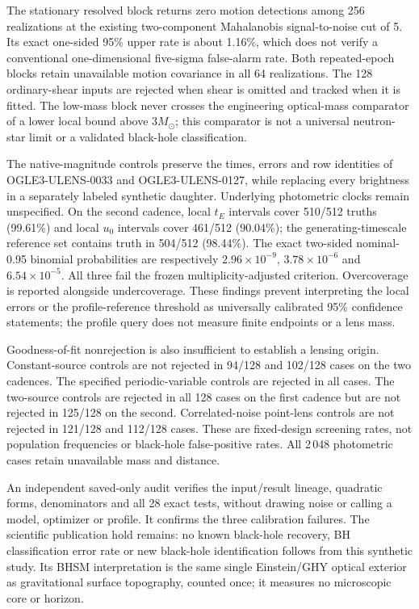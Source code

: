 The stationary resolved block returns zero motion detections among 256
realizations at the existing two-component Mahalanobis signal-to-noise
cut of 5. Its exact one-sided 95\% upper rate is about 1.16\%, which does
not verify a conventional one-dimensional five-sigma false-alarm rate.
Both repeated-epoch blocks retain unavailable motion covariance in all
64 realizations. The 128 ordinary-shear inputs are rejected when shear
is omitted and tracked when it is fitted. The low-mass block never crosses
the engineering optical-mass comparator of a lower local bound above
$3M_\odot$; this comparator is not a universal neutron-star limit or a
validated black-hole classification.

The native-magnitude controls preserve the times, errors and row identities
of OGLE3-ULENS-0033 and OGLE3-ULENS-0127, while replacing every brightness
in a separately labeled synthetic daughter. Underlying photometric clocks
remain unspecified. On the second cadence, local $t_E$ intervals cover
510/512 truths (99.61\%) and local $u_0$ intervals cover 461/512 (90.04\%);
the generating-timescale reference set contains truth in 504/512 (98.44\%).
The exact two-sided nominal-0.95 binomial probabilities are respectively
$2.96\times10^{-9}$, $3.78\times10^{-6}$ and $6.54\times10^{-5}$.
All three fail the frozen multiplicity-adjusted criterion. Overcoverage
is reported alongside undercoverage. These findings prevent interpreting
the local errors or the profile-reference threshold as universally
calibrated 95\% confidence statements; the profile query does not measure
finite endpoints or a lens mass.

Goodness-of-fit nonrejection is also insufficient to establish a lensing
origin. Constant-source controls are not rejected in 94/128 and 102/128
cases on the two cadences. The specified periodic-variable controls are
rejected in all cases. The two-source controls are rejected in all 128
cases on the first cadence but are not rejected in 125/128 on the second.
Correlated-noise point-lens controls are not rejected in 121/128 and
112/128 cases. These are fixed-design screening rates, not population
frequencies or black-hole false-positive rates. All 2\,048 photometric
cases retain unavailable mass and distance.

An independent saved-only audit verifies the input/result lineage,
quadratic forms, denominators and all 28 exact tests, without drawing
noise or calling a model, optimizer or profile. It confirms the three
calibration failures. The scientific publication hold remains: no known
black-hole recovery, BH classification error rate or new black-hole
identification follows from this synthetic study. Its BHSM interpretation
is the same single Einstein/GHY optical exterior as gravitational surface
topography, counted once; it measures no microscopic core or horizon.
